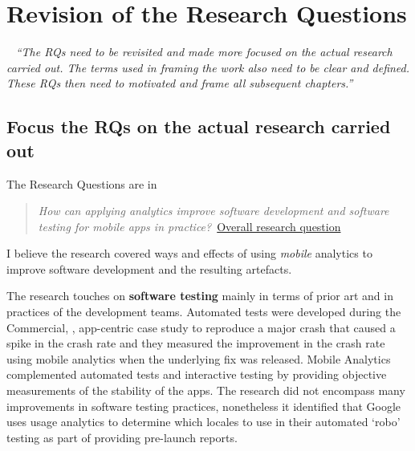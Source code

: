 \section{Revision of the Research Questions}~\label{corrections-rqs}
\emph{``The RQs need to be revisited and made more focused on the actual research carried out. The terms used in framing the work also need to be clear and defined. These RQs then need to motivated and frame all subsequent chapters.''}

\subsection{Focus the RQs on the actual research carried out}
The Research Questions are in 

\begin{kaobox}[frametitle=The original RQ]
\begin{quote}
  \emph{How can applying analytics improve software development and software testing for mobile apps in practice?}~\href{overall-research-question}{Overall research question}
\end{quote}    
\end{kaobox}

I believe the research covered ways and effects  of using \emph{mobile} analytics to improve software development and the resulting artefacts.

The research touches on \textbf{software testing} mainly in terms of prior art and in practices of the development teams. Automated tests were developed during the Commercial, , app-centric case study to reproduce a major crash that caused a spike in the crash rate and they measured the improvement in the crash rate using mobile analytics when the underlying fix was released. Mobile Analytics complemented automated tests and interactive testing by providing objective measurements of the stability of the apps. The research did not encompass many improvements in software testing practices, nonetheless it identified that Google uses usage analytics to determine which locales to use in their automated `robo' testing as part of providing pre-launch reports.

